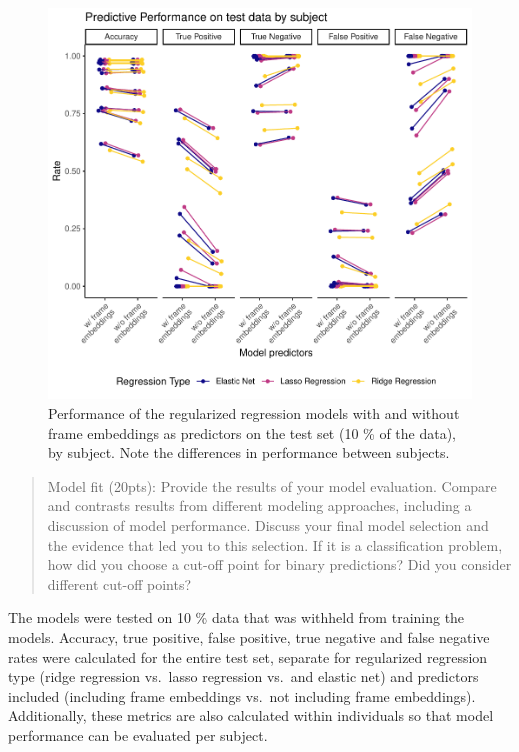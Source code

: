 \documentclass[
  man]{apa6}
\begin{document}
\begin{figure}
\includegraphics[width=0.95\linewidth]{FinalReport_files/figure-latex/fit-ID-1} \caption{Performance of the regularized regression models with and without frame embeddings as predictors on the test set (10 \% of the data), by subject. Note the differences in performance between subjects.}\label{fig:fit-ID}
\end{figure}

\begin{quote}
Model fit (20pts): Provide the results of your model evaluation. Compare and contrasts results from different modeling approaches, including a discussion of model performance. Discuss your final model selection and the evidence that led you to this selection. If it is a classification problem, how did you choose a cut-off point for binary predictions? Did you consider different cut-off points?
\end{quote}

The models were tested on 10 \% data that was withheld from training the models. Accuracy, true positive, false positive, true negative and false negative rates were calculated for the entire test set, separate for regularized regression type (ridge regression vs.~lasso regression vs.~and elastic net) and predictors included (including frame embeddings vs.~not including frame embeddings). Additionally, these metrics are also calculated within individuals so that model performance can be evaluated per subject.
\end{document}
